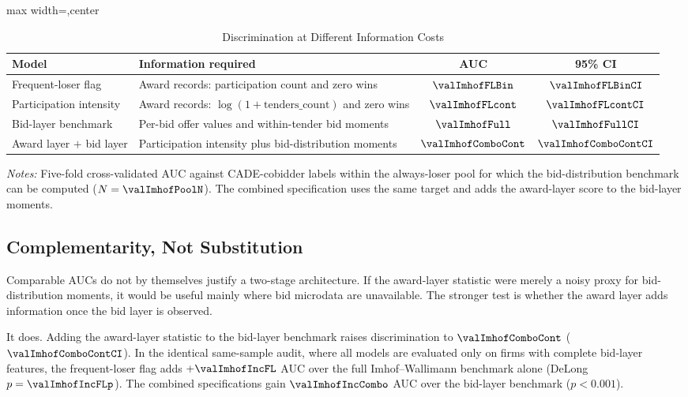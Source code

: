 \begin{table}[htbp]
\centering
\caption{Discrimination at Different Information Costs}
\label{tab:imhof_cost_v18}
\footnotesize
\begin{adjustbox}{max width=\textwidth,center}
\begin{threeparttable}
\begin{tabular}{p{4.6cm}p{5.4cm}cc}
\toprule
Model & Information required & AUC & 95\% CI \\
\midrule
Frequent-loser flag & Award records: participation count and zero wins
& $\valImhofFLBin$ & $\valImhofFLBinCI$ \\
Participation intensity & Award records: $\log(1+\text{tenders\_count})$ and zero wins
& $\valImhofFLcont$ & $\valImhofFLcontCI$ \\
Bid-layer benchmark & Per-bid offer values and within-tender bid moments
& $\valImhofFull$ & $\valImhofFullCI$ \\
Award layer $+$ bid layer & Participation intensity plus bid-distribution moments
& $\valImhofComboCont$ & $\valImhofComboContCI$ \\
\bottomrule
\end{tabular}
\begin{tablenotes}
\footnotesize
\item \textit{Notes:} Five-fold cross-validated AUC against
CADE-cobidder labels within the always-loser pool for which the
bid-distribution benchmark can be computed
($N=\valImhofPoolN$). The combined specification uses the same
target and adds the award-layer score to the bid-layer moments.
\end{tablenotes}
\end{threeparttable}
\end{adjustbox}
\end{table}

\subsection{Complementarity, Not Substitution}
\label{sec:complementary_signals}

Comparable AUCs do not by themselves justify a two-stage
architecture. If the award-layer statistic were merely a noisy
proxy for bid-distribution moments, it would be useful mainly
where bid microdata are unavailable. The stronger test is
whether the award layer adds information once the bid layer is
observed.

It does. Adding the award-layer statistic to the bid-layer
benchmark raises discrimination to $\valImhofComboCont$
($\valImhofComboContCI$). In the identical same-sample audit,
where all models are evaluated only on firms with complete
bid-layer features, the frequent-loser flag adds
$+\valImhofIncFL$ AUC over the full Imhof--Wallimann benchmark
alone (DeLong $p=\valImhofIncFLp$). The combined specifications
gain $\valImhofIncCombo$ AUC over the bid-layer benchmark
($p<0.001$).

